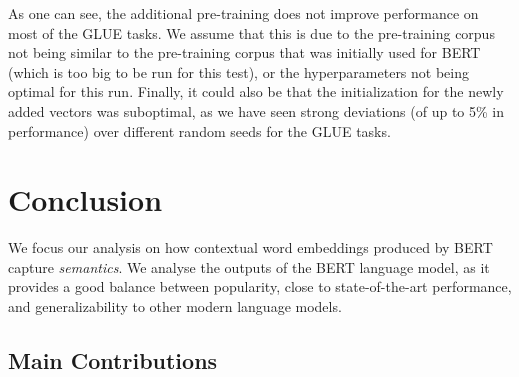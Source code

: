 \documentclass[a4paper,12pt,oneside,openright]{report}
\begin{document}

\hfill \break

As one can see, the additional pre-training does not improve performance on most of the GLUE tasks.
We assume that this is due to the pre-training corpus not being similar to the pre-training corpus that was initially used for BERT (which is too big to be run for this test), or the hyperparameters not being optimal for this run.
Finally, it could also be that the initialization for the newly added vectors was suboptimal, as we have seen strong deviations (of up to 5\% in performance) over different random seeds for the GLUE tasks.

\chapter{Conclusion}\label{section:Conclusion}

We focus our analysis on how contextual word embeddings produced by BERT capture \textit{semantics}. 
We analyse the outputs of the BERT language model, as it provides a good balance between popularity, close to state-of-the-art performance, and generalizability to other modern language models.

\section{Main Contributions}
\end{document}
